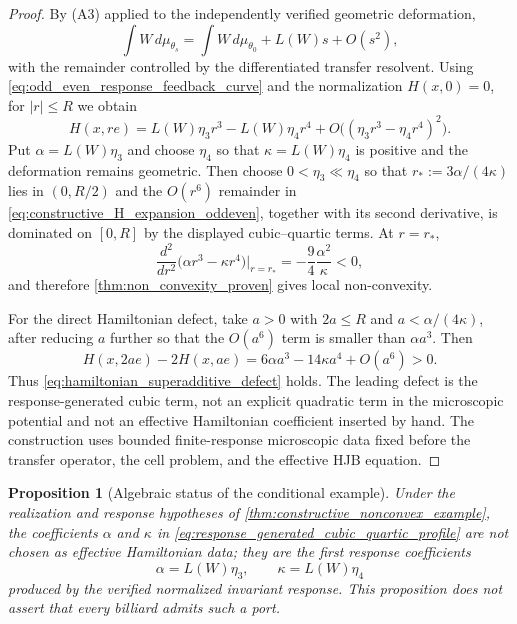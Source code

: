 \documentclass[12pt, letterpaper]{amsart}
\theoremstyle{plain}
\newtheorem{proposition}[theorem]{Proposition}
\theoremstyle{definition}
\theoremstyle{remark}
\begin{document}
\begin{proof}
By \textup{(A3)} applied to the independently verified geometric deformation,
\begin{equation}
\label{eq:response_taylor_first_order_constructive}
    \int W\,d\mu_{\theta_s}
    =\int W\,d\mu_{\theta_0}+L(W)s+O(s^2),
\end{equation}
with the remainder controlled by the differentiated transfer resolvent.  Using
\eqref{eq:odd_even_response_feedback_curve} and the normalization $H(x,0)=0$,
for $|r|\le R$ we obtain
\begin{equation}
\label{eq:constructive_H_expansion_oddeven}
    H(x,re)
    =L(W)\eta_3 r^3-L(W)\eta_4 r^4
      +O\bigl((\eta_3r^3-\eta_4r^4)^2\bigr).
\end{equation}
Put $\alpha=L(W)\eta_3$ and choose $\eta_4$ so that
$\kappa=L(W)\eta_4$ is positive and the deformation remains geometric.  Then
choose $0<\eta_3\ll\eta_4$ so that
$r_*:=3\alpha/(4\kappa)$ lies in $(0,R/2)$ and the $O(r^6)$ remainder in
\eqref{eq:constructive_H_expansion_oddeven}, together with its second derivative,
is dominated on $[0,R]$ by the displayed cubic--quartic terms.  At
$r=r_*$,
\begin{equation}
    \frac{d^2}{dr^2}\bigl(\alpha r^3-\kappa r^4\bigr)\Big|_{r=r_*}
    =-\frac{9}{4}\frac{\alpha^2}{\kappa}<0,
\end{equation}
and therefore \cref{thm:non_convexity_proven} gives local non-convexity.

For the direct Hamiltonian defect, take $a>0$ with $2a\le R$ and
$a<\alpha/(4\kappa)$, after reducing $a$ further so that the $O(a^6)$ term is
smaller than $\alpha a^3$.  Then
\begin{equation}
\label{eq:response_driven_superadditivity_defect}
    H(x,2ae)-2H(x,ae)
    =6\alpha a^3-14\kappa a^4+O(a^6)>0 .
\end{equation}
Thus \eqref{eq:hamiltonian_superadditive_defect} holds.  The leading defect is
the response-generated cubic term, not an explicit quadratic term in the
microscopic potential and not an effective Hamiltonian coefficient inserted by
hand.  The construction uses bounded finite-response microscopic data fixed
before the transfer operator, the cell problem, and the effective HJB equation.
\end{proof}


\begin{proposition}[Algebraic status of the conditional example]
\label{prop:triangular_bump_no_effective_encoding}
Under the realization and response hypotheses of
\cref{thm:constructive_nonconvex_example}, the coefficients
\(\alpha\) and \(\kappa\) in
\eqref{eq:response_generated_cubic_quartic_profile} are not chosen as effective
Hamiltonian data; they are the first response coefficients
\begin{equation}
    \alpha=L(W)\eta_3,
    \qquad
    \kappa=L(W)\eta_4
\end{equation}
produced by the verified normalized invariant response. This proposition does
not assert that every billiard admits such a port.
\end{proposition}
\end{document}
